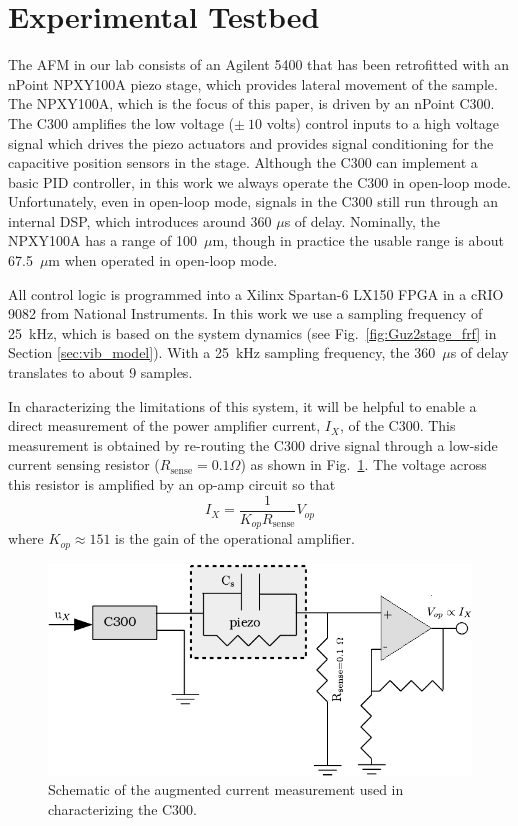 \documentclass[twocolumn,twoside]{IEEEtran}
\begin{document}
\section{Experimental Testbed}\label{sec:testbed}
The AFM in our lab consists of an Agilent 5400 that has been retrofitted with an nPoint NPXY100A piezo stage, which provides lateral movement of the sample. The NPXY100A, which is the focus of this paper, is driven by an nPoint C300. The C300 amplifies the low voltage ($\pm~10$ volts) control inputs to a high voltage signal which drives the piezo actuators and provides signal conditioning for the capacitive position sensors in the stage. Although the C300 can implement a basic PID controller, in this work we always operate the C300 in open-loop mode. Unfortunately, even in open-loop mode, signals in the C300 still run through an internal DSP, which introduces around 360 $\mu$s of delay. Nominally, the NPXY100A has a range of 100~$\mu$m, though in practice the usable range is about 67.5~$\mu$m when operated in open-loop mode.

All control logic is programmed into a Xilinx Spartan-6 LX150 FPGA in a cRIO 9082 from National Instruments.
In this work we use a sampling frequency of 25~kHz, which is based on the system dynamics (see Fig.~\ref{fig:Guz2stage_frf} in Section \ref{sec:vib_model}). With a 25~kHz sampling frequency, the 360~$\mu$s of delay translates to about 9 samples.

In characterizing the limitations of this system, it will be helpful to enable a direct measurement of the power amplifier current, $I_X$, of the C300. This measurement is obtained by re-routing the C300 drive signal through a low-side current sensing resistor (${R_{\text{sense}}=0.1\Omega}$) as shown in Fig.~\ref{fig:c300_meas}.
The voltage across this resistor is amplified by an op-amp circuit so that
\begin{equation}
I_{X} = \frac{1}{K_{op}R_{\text{sense}}}V_{op}\nonumber
\end{equation}
where $K_{op}\approx 151$ is the gain of the operational amplifier.


\begin{figure}
    \includegraphics[width=1\columnwidth]{figures/c300_measurement_cropped.pdf}
    \caption{Schematic of the augmented current measurement used in characterizing the C300.}
    \label{fig:c300_meas}
\end{figure}
\end{document}
